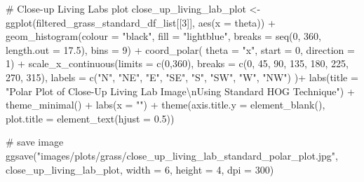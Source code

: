 \documentclass[
  letterpaper,
  DIV=11,
  numbers=noendperiod]{scrreprt}
\newenvironment{Shaded}{\begin{snugshade}}{\end{snugshade}}
\newcommand{\AttributeTok}[1]{\textcolor[rgb]{0.40,0.45,0.13}{#1}}
\newcommand{\CommentTok}[1]{\textcolor[rgb]{0.37,0.37,0.37}{#1}}
\newcommand{\DecValTok}[1]{\textcolor[rgb]{0.68,0.00,0.00}{#1}}
\newcommand{\FloatTok}[1]{\textcolor[rgb]{0.68,0.00,0.00}{#1}}
\newcommand{\FunctionTok}[1]{\textcolor[rgb]{0.28,0.35,0.67}{#1}}
\newcommand{\NormalTok}[1]{\textcolor[rgb]{0.00,0.23,0.31}{#1}}
\newcommand{\OtherTok}[1]{\textcolor[rgb]{0.00,0.23,0.31}{#1}}
\newcommand{\SpecialCharTok}[1]{\textcolor[rgb]{0.37,0.37,0.37}{#1}}
\newcommand{\StringTok}[1]{\textcolor[rgb]{0.13,0.47,0.30}{#1}}
\begin{document}
\begin{Shaded}
\begin{Highlighting}[]
\CommentTok{\# Close{-}up Living Labs plot}
\NormalTok{close\_up\_living\_lab\_plot }\OtherTok{\textless{}{-}}
  \FunctionTok{ggplot}\NormalTok{(filtered\_grass\_standard\_df\_list[[}\DecValTok{3}\NormalTok{]], }
         \FunctionTok{aes}\NormalTok{(}\AttributeTok{x =}\NormalTok{ theta)) }\SpecialCharTok{+}
  \FunctionTok{geom\_histogram}\NormalTok{(}\AttributeTok{colour =} \StringTok{"black"}\NormalTok{, }
                 \AttributeTok{fill =} \StringTok{"lightblue"}\NormalTok{, }
                 \AttributeTok{breaks =} \FunctionTok{seq}\NormalTok{(}\DecValTok{0}\NormalTok{, }\DecValTok{360}\NormalTok{, }\AttributeTok{length.out =} \FloatTok{17.5}\NormalTok{),}
                 \AttributeTok{bins =} \DecValTok{9}\NormalTok{) }\SpecialCharTok{+}
  \FunctionTok{coord\_polar}\NormalTok{(}
    \AttributeTok{theta =} \StringTok{"x"}\NormalTok{, }
    \AttributeTok{start =} \DecValTok{0}\NormalTok{, }
    \AttributeTok{direction =} \DecValTok{1}\NormalTok{) }\SpecialCharTok{+}
  \FunctionTok{scale\_x\_continuous}\NormalTok{(}\AttributeTok{limits =} \FunctionTok{c}\NormalTok{(}\DecValTok{0}\NormalTok{,}\DecValTok{360}\NormalTok{),}
    \AttributeTok{breaks =} \FunctionTok{c}\NormalTok{(}\DecValTok{0}\NormalTok{, }\DecValTok{45}\NormalTok{, }\DecValTok{90}\NormalTok{, }\DecValTok{135}\NormalTok{, }\DecValTok{180}\NormalTok{, }\DecValTok{225}\NormalTok{, }\DecValTok{270}\NormalTok{, }\DecValTok{315}\NormalTok{), }
    \AttributeTok{labels =} \FunctionTok{c}\NormalTok{(}\StringTok{"N"}\NormalTok{, }\StringTok{"NE"}\NormalTok{, }\StringTok{"E"}\NormalTok{, }\StringTok{"SE"}\NormalTok{, }\StringTok{"S"}\NormalTok{, }\StringTok{"SW"}\NormalTok{, }\StringTok{"W"}\NormalTok{, }\StringTok{"NW"}\NormalTok{)}
\NormalTok{  )}\SpecialCharTok{+}
  \FunctionTok{labs}\NormalTok{(}\AttributeTok{title =} \StringTok{"Polar Plot of Close{-}Up Living Lab Image}\SpecialCharTok{\textbackslash{}n}\StringTok{Using Standard HOG Technique"}\NormalTok{) }\SpecialCharTok{+}
  \FunctionTok{theme\_minimal}\NormalTok{() }\SpecialCharTok{+}
  \FunctionTok{labs}\NormalTok{(}\AttributeTok{x =} \StringTok{""}\NormalTok{) }\SpecialCharTok{+}
  \FunctionTok{theme}\NormalTok{(}\AttributeTok{axis.title.y =} \FunctionTok{element\_blank}\NormalTok{(),}
        \AttributeTok{plot.title =} \FunctionTok{element\_text}\NormalTok{(}\AttributeTok{hjust =} \FloatTok{0.5}\NormalTok{))}

\CommentTok{\# save image}
\FunctionTok{ggsave}\NormalTok{(}\StringTok{"images/plots/grass/close\_up\_living\_lab\_standard\_polar\_plot.jpg"}\NormalTok{, close\_up\_living\_lab\_plot, }\AttributeTok{width =} \DecValTok{6}\NormalTok{, }\AttributeTok{height =} \DecValTok{4}\NormalTok{, }\AttributeTok{dpi =} \DecValTok{300}\NormalTok{)}
\end{Highlighting}
\end{Shaded}
\end{document}
